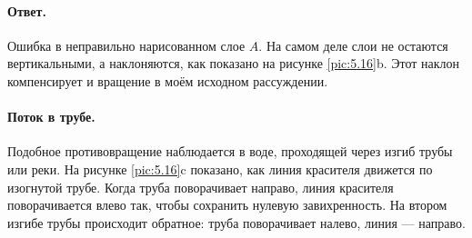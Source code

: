 \paragraph{Ответ.}
Ошибка в неправильно нарисованном слое $A$.
На самом деле слои не остаются вертикальными, а наклоняются, как показано на рисунке \ref{pic:5.16}b.
Этот наклон компенсирует и вращение в моём исходном рассуждении.

\paragraph{Поток в трубе.}
Подобное противовращение наблюдается в воде, проходящей через изгиб трубы или реки.
На рисунке \ref{pic:5.16}c показано, как линия красителя движется по изогнутой трубе.
Когда труба поворачивает направо, линия красителя поворачивается влево так, чтобы сохранить нулевую завихренность. На втором изгибе трубы происходит обратное: труба поворачивает налево, линия — направо.
